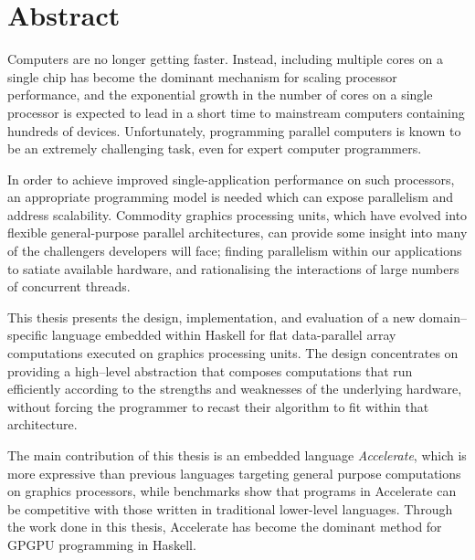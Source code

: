 
\chapter{Abstract}

Computers are no longer getting faster. Instead, including multiple cores on a
single chip has become the dominant mechanism for scaling processor performance,
and the exponential growth in the number of cores on a single processor is
expected to lead in a short time to mainstream computers containing hundreds of
devices. Unfortunately, programming parallel computers is known to be an
extremely challenging task, even for expert computer programmers.

In order to achieve improved single-application performance on such processors,
an appropriate programming model is needed which can expose parallelism and
address scalability. Commodity graphics processing units, which have evolved
into flexible general-purpose parallel architectures, can provide some insight
into many of the challengers developers will face; finding parallelism within
our applications to satiate available hardware, and rationalising the
interactions of large numbers of concurrent threads.

This thesis presents the design, implementation, and evaluation of a new
domain--specific language embedded within Haskell for flat data-parallel array
computations executed on graphics processing units. The design concentrates on
providing a high--level abstraction that composes computations that run
efficiently according to the strengths and weaknesses of the underlying
hardware, without forcing the programmer to recast their algorithm to fit within
that architecture.

The main contribution of this thesis is an embedded language \emph{Accelerate},
which is more expressive than previous languages targeting general purpose
computations on graphics processors, while benchmarks show that programs in
Accelerate can be competitive with those written in traditional lower-level
languages. Through the work done in this thesis, Accelerate has become the
dominant method for GPGPU programming in Haskell.


